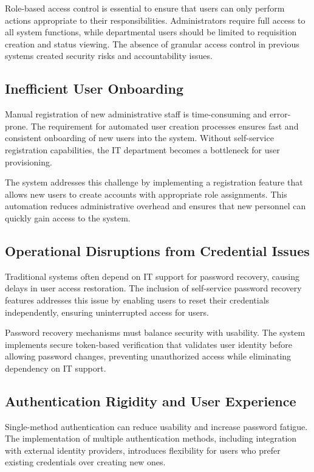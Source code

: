 Role-based access control is essential to ensure that users can only perform actions appropriate to their responsibilities. Administrators require full access to all system functions, while departmental users should be limited to requisition creation and status viewing. The absence of granular access control in previous systems created security risks and accountability issues.

\subsection{Inefficient User Onboarding}

Manual registration of new administrative staff is time-consuming and error-prone. The requirement for automated user creation processes ensures fast and consistent onboarding of new users into the system. Without self-service registration capabilities, the IT department becomes a bottleneck for user provisioning.

The system addresses this challenge by implementing a registration feature that allows new users to create accounts with appropriate role assignments. This automation reduces administrative overhead and ensures that new personnel can quickly gain access to the system.

\subsection{Operational Disruptions from Credential Issues}

Traditional systems often depend on IT support for password recovery, causing delays in user access restoration. The inclusion of self-service password recovery features addresses this issue by enabling users to reset their credentials independently, ensuring uninterrupted access for users.

Password recovery mechanisms must balance security with usability. The system implements secure token-based verification that validates user identity before allowing password changes, preventing unauthorized access while eliminating dependency on IT support.

\subsection{Authentication Rigidity and User Experience}

Single-method authentication can reduce usability and increase password fatigue. The implementation of multiple authentication methods, including integration with external identity providers, introduces flexibility for users who prefer existing credentials over creating new ones.


